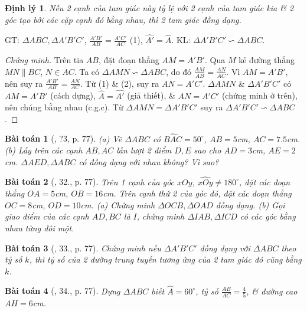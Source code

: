 \documentclass{article}
\newtheorem{baitoan}{Bài toán}
\newtheorem{dinhly}{Định lý}
\begin{document}
\begin{dinhly}
	Nếu 2 cạnh của tam giác này tỷ lệ với 2 cạnh của tam giác kia \& 2 góc tạo bởi các cặp cạnh đó bằng nhau, thì 2 tam giác đồng dạng.
\end{dinhly}
GT: $\Delta ABC,\Delta A'B'C'$, $\frac{A'B'}{AB} = \frac{A'C'}{AC}$ (1), $\widehat{A'} = \widehat{A}$. KL: $\Delta A'B'C'\backsim\Delta ABC$.

\begin{proof}[Chứng minh]
	Trên tia $AB$, đặt đoạn thẳng $AM = A'B'$. Qua $M$ kẻ đường thẳng $MN\parallel BC$, $N\in AC$. Ta có $\Delta AMN\backsim\Delta ABC$, do đó $\frac{AM}{AB} = \frac{AN}{AC}$. Vì $AM = A'B'$, nên suy ra $\frac{A'B'}{AB} = \frac{AN}{AC}$. Từ (1) \& (2), suy ra $AN = A'C'$. $\Delta AMN$ \& $\Delta A'B'C'$ có $AM = A'B'$ (cách dựng), $\widehat{A} = \widehat{A'}$ (giả thiết), \& $AN = A'C'$ (chứng minh ở trên), nên chúng bằng nhau (c.g.c). Từ $\Delta AMN = \Delta A'B'C'$ suy ra $\Delta A'B'C'\backsim\Delta ABC$.
\end{proof}

\begin{baitoan}[\cite{SGK_Toan_8_tap_2}, ?3, p. 77]
	(a) Vẽ $\Delta ABC$ có $\widehat{BAC} = 50^\circ$, $AB = 5$\emph{cm}, $AC = 7.5$\emph{cm}. (b) Lấy trên các cạnh $AB,AC$ lần lượt 2 điểm $D,E$ sao cho $AD = 3$\emph{cm}, $AE = 2$\emph{cm}. $\Delta AED,\Delta ABC$ có đồng dạng với nhau không? Vì sao?
\end{baitoan}

\begin{baitoan}[\cite{SGK_Toan_8_tap_2}, 32., p. 77]
	Trên 1 cạnh của góc $xOy$, $\widehat{xOy}\ne180^\circ$, đặt các đoạn thẳng $OA = 5$\emph{cm}, $OB = 16$\emph{cm}. Trên cạnh thứ 2 của góc đó, đặt các đoạn thẳng $OC = 8$\emph{cm}, $OD = 10$\emph{cm}. (a) Chứng minh $\Delta OCB,\Delta OAD$ đồng dạng. (b) Gọi giao điểm của các cạnh $AD,BC$ là $I$, chứng minh $\Delta IAB,\Delta ICD$ có các góc bằng nhau từng đôi một.
\end{baitoan}

\begin{baitoan}[\cite{SGK_Toan_8_tap_2}, 33., p. 77]
	Chứng minh nếu $\Delta A'B'C'$ đồng dạng với $\Delta ABC$ theo tỷ số $k$, thì tỷ số của 2 đường trung tuyến tương ứng của 2 tam giác đó cũng bằng $k$.
\end{baitoan}

\begin{baitoan}[\cite{SGK_Toan_8_tap_2}, 34., p. 77]
	Dựng $\Delta ABC$ biết $\widehat{A} = 60^\circ$, tỷ số $\frac{AB}{AC} = \frac{4}{5}$, \& đường cao $AH = 6$\emph{cm}.
\end{baitoan}
\end{document}
